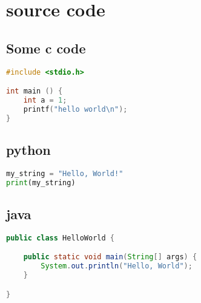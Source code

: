 


\section{source code}
\label{sec:orgd92bc3a}

\subsection{Some c code}
\label{sec:orgc53354f}
\begin{lstlisting}[language=C, caption=C example]
#include <stdio.h>

int main () {
    int a = 1;
    printf("hello world\n");
}
\end{lstlisting}

\subsection{python}
\label{sec:org131ba1a}
\begin{lstlisting}[language=Python, caption=Python example]
my_string = "Hello, World!"
print(my_string)
\end{lstlisting}

\subsection{java}
\label{sec:org7f8c966}
\begin{lstlisting}[language=Java, caption=Java example]
public class HelloWorld {

    public static void main(String[] args) {
        System.out.println("Hello, World");
    }

}
\end{lstlisting}



